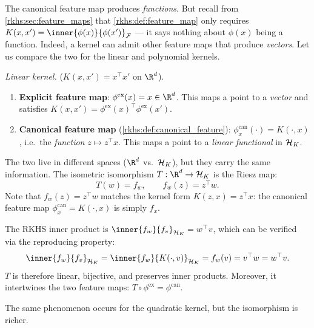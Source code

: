 \begin{notechapter}
\begin{intuition}
The canonical feature map produces \emph{functions}.
But recall from \cref{rkhs:sec:feature_maps} that
\cref{rkhs:def:feature_map} only requires
$K(x,x') = \inner{\phi(x)}{\phi(x')}_{\mathcal{F}}$
--- it says nothing about $\phi(x)$ being a function.
Indeed, a kernel can admit other feature maps that
produce \emph{vectors}. Let us compare the two for
the linear and polynomial kernels.

\medskip
\emph{Linear kernel.}
($K(x,x') = x^\top x'$ on $\R^d$).
\begin{enumerate}
  \item \textbf{Explicit feature map}:
    $\phi^{\mathrm{ex}}(x) = x \in \R^d$.
    This maps a point to a \emph{vector} and satisfies
    $K(x,x') = \phi^{\mathrm{ex}}(x)^\top
    \phi^{\mathrm{ex}}(x')$.
  \item \textbf{Canonical feature map}
    (\cref{rkhs:def:canonical_feature}):
    $\phi_x^{\mathrm{can}}(\cdot) = K(\cdot,x)$,
    i.e.\ the \emph{function}
    $z \mapsto z^\top x$.
    This maps a point to a \emph{linear functional}
    in $\mathcal{H}_K$.
\end{enumerate}
The two live in different spaces ($\R^d$ vs.\
$\mathcal{H}_K$), but they carry the same information. The
isometric isomorphism $T: \R^d \to \hk$ is the
Riesz map:
\[
T(w) = f_w, \qquad f_w(z) = z^\top w.
\]
Note that $f_w(z) = z^\top w$ matches the kernel form
$K(z,x) = z^\top x$: the canonical feature map
$\phi_x^{\mathrm{can}} = K(\cdot, x)$ is simply
$f_x$.

The RKHS inner product is
$\inner{f_w}{f_v}_{\hk} = w^\top v$, which can be
verified via the reproducing property:
\[
\inner{f_w}{f_v}_{\hk}
= \inner{f_w}{K(\cdot, v)}_{\hk}
= f_w(v) = v^\top w = w^\top v.
\]
$T$ is therefore linear, bijective, and preserves
inner products. Moreover, it intertwines the two
feature maps:
$T \circ \phi^{\mathrm{ex}} = \phi^{\mathrm{can}}$.
\end{intuition}

\begin{intuition}
The same phenomenon occurs for the quadratic kernel,
but the isomorphism is richer.


\end{intuition}
\end{notechapter}
